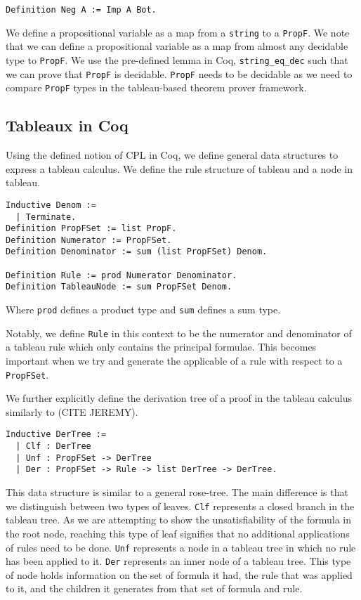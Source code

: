 \documentclass{llncs}
\begin{document}
\begin{verbatim}
Definition Neg A := Imp A Bot.
\end{verbatim}

We define a propositional variable as a map from a \verb+string+ to a
\verb+PropF+. We note that we can define a propositional variable as a map from
almost any decidable type to \verb+PropF+. We use the pre-defined lemma in Coq,
\verb+string_eq_dec+ such that we can prove that \verb+PropF+ is decidable.
\verb+PropF+ needs to be decidable as we need to compare \verb+PropF+ types in
the tableau-based theorem prover framework.

\subsection{Tableaux in Coq}

Using the defined notion of CPL in Coq, we define general data structures to
express a tableau calculus. We define the rule structure of tableau and a node
in tableau.

\begin{verbatim}
Inductive Denom :=
  | Terminate.
Definition PropFSet := list PropF.
Definition Numerator := PropFSet.
Definition Denominator := sum (list PropFSet) Denom.

Definition Rule := prod Numerator Denominator.
Definition TableauNode := sum PropFSet Denom.
\end{verbatim}

Where \verb+prod+ defines a product type and \verb+sum+ defines a sum type.

Notably, we define \verb+Rule+ in this context to be the numerator and
denominator of a tableau rule which only contains the principal formulae. This
becomes important when we try and generate the applicable of a rule with
respect to a \verb+PropFSet+.

We further explicitly define the derivation tree of a proof in the tableau
calculus similarly to (CITE JEREMY).

\begin{verbatim}
Inductive DerTree :=
  | Clf : DerTree
  | Unf : PropFSet -> DerTree
  | Der : PropFSet -> Rule -> list DerTree -> DerTree.
\end{verbatim}

This data structure is similar to a general rose-tree. The main difference is
that we distinguish between two types of leaves. \verb+Clf+ represents a closed
branch in the tableau tree. As we are attempting to show the unsatisfiability
of the formula in the root node, reaching this type of leaf signifies that no
additional applications of rules need to be done. \verb+Unf+ represents a node
in a tableau tree in which no rule has been applied to it. \verb+Der+
represents an inner node of a tableau tree. This type of node holds information
on the set of formula it had, the rule that was applied to it, and the children
it generates from that set of formula and rule.
\end{document}
